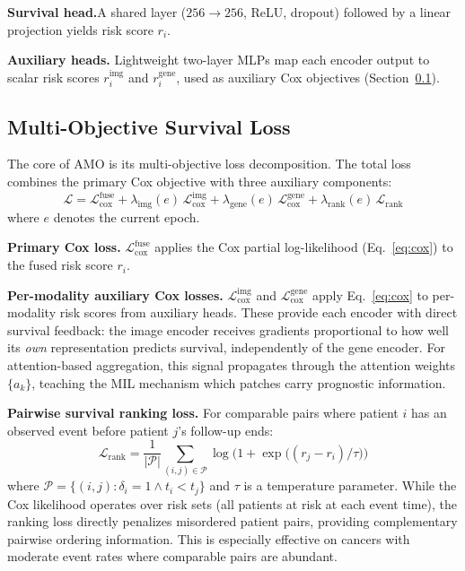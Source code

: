 \documentclass[10pt,twocolumn,letterpaper]{article}
\begin{document}
\noindent\textbf{Survival head.}A shared layer ($256 \to 256$, ReLU, dropout) followed by a linear
projection yields risk score $r_i$.

\noindent\textbf{Auxiliary heads.}
Lightweight two-layer MLPs map each encoder output to scalar
risk scores $r^{\text{img}}_i$ and $r^{\text{gene}}_i$, used
as auxiliary Cox objectives (Section~\ref{sec:loss}).

\subsection{Multi-Objective Survival Loss}
\label{sec:loss}

The core of AMO is its multi-objective loss decomposition.
The total loss combines the primary Cox objective with three
auxiliary components:
\begin{equation}
\mathcal{L} = \mathcal{L}_{\text{cox}}^{\text{fuse}} +
\lambda_{\text{img}}(e) \,\mathcal{L}_{\text{cox}}^{\text{img}} +
\lambda_{\text{gene}}(e) \,\mathcal{L}_{\text{cox}}^{\text{gene}} +
\lambda_{\text{rank}}(e) \,\mathcal{L}_{\text{rank}}
\label{eq:total_loss}
\end{equation}
where $e$ denotes the current epoch.

\noindent\textbf{Primary Cox loss.}
$\mathcal{L}_{\text{cox}}^{\text{fuse}}$ applies the Cox partial
log-likelihood (Eq.~\ref{eq:cox}) to the fused risk score $r_i$.

\noindent\textbf{Per-modality auxiliary Cox losses.}
$\mathcal{L}_{\text{cox}}^{\text{img}}$ and
$\mathcal{L}_{\text{cox}}^{\text{gene}}$ apply Eq.~\ref{eq:cox}
to per-modality risk scores from auxiliary heads. These provide each
encoder with direct survival feedback: the image encoder receives
gradients proportional to how well its \textit{own} representation
predicts survival, independently of the gene encoder. For
attention-based aggregation, this signal propagates through the
attention weights $\{a_k\}$, teaching the MIL mechanism which
patches carry prognostic information.

\noindent\textbf{Pairwise survival ranking loss.}
For comparable pairs where patient $i$ has an observed event before
patient $j$'s follow-up ends:
\begin{equation}
\mathcal{L}_{\text{rank}} = \frac{1}{|\mathcal{P}|}
\sum_{(i,j) \in \mathcal{P}}
\log\bigl(1 + \exp\!\bigl((r_j - r_i)/\tau\bigr)\bigr)
\label{eq:rank}
\end{equation}
where $\mathcal{P} = \{(i,j) : \delta_i = 1 \land t_i < t_j\}$
and $\tau$ is a temperature parameter. While the Cox likelihood
operates over risk sets (all patients at risk at each event time),
the ranking loss directly penalizes misordered patient pairs,
providing complementary pairwise ordering information. This is
especially effective on cancers with moderate event rates where
comparable pairs are abundant.
\end{document}
